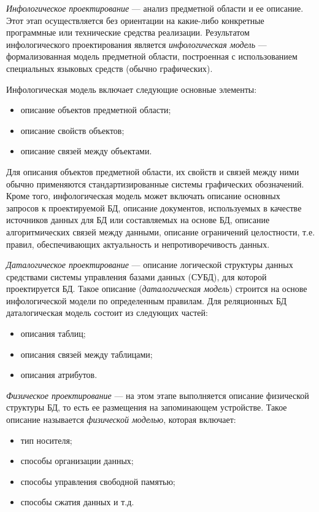 \textit{Инфологическое проектирование} --- анализ
предметной области и ее описание. Этот этап осуществляется без ориентации
на какие-либо конкретные программные или технические средства реализации.
Результатом инфологического проектирования является
\textit{инфологическая модель} --- формализованная модель предметной области,
построенная с использованием специальных языковых средств (обычно графических).

Инфологическая модель включает следующие основные элементы:
\begin{itemize}
\item
  описание объектов предметной области;
\item
  описание свойств объектов;
\item
  описание связей между объектами.
\end{itemize}

Для описания объектов предметной области, их свойств и связей между
ними обычно применяются стандартизированные системы графических обозначений.
Кроме того, инфологическая модель может включать
описание основных запросов к проектируемой БД,
описание документов, используемых в качестве
источников данных для БД или составляемых на основе БД,
описание алгоритмических связей между данными,
описание ограничений целостности, т.е. правил, обеспечивающих
актуальность и непротиворечивость данных.

\textit{Даталогическое проектирование} --- описание
логической структуры данных средствами системы управления базами данных
(СУБД), для которой проектируется БД.
Такое описание (\textit{даталогическая модель}) строится на основе инфологической модели
по определенным правилам.
Для реляционных БД даталогическая модель состоит из следующих частей:
\begin{itemize}
\item
  описания таблиц;
\item
  описания связей между таблицами;
\item
  описания атрибутов.
\end{itemize}

\textit{Физическое проектирование} --- на этом этапе выполняется описание
физической структуры БД, то есть ее размещения на запоминающем устройстве.
Такое описание называется \textit{физической моделью}, которая включает:

\begin{itemize}
\item
  тип носителя;
\item
  способы организации данных;
\item
  способы управления свободной памятью;
\item
  способы сжатия данных и т.д.
\end{itemize}

